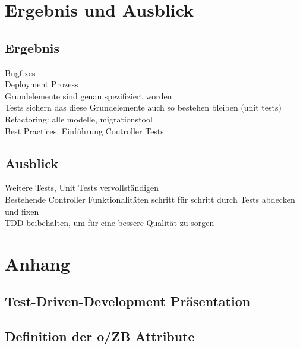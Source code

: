 \documentclass[12pt,             %
               a4paper,          %
               listof=totoc,     %
               index=totoc,      %
               bibliography=totoc,%
               oneside,         %
               BCOR1cm,          %
               english   %
               ]{scrbook}
\begin{document}
\chapter{Ergebnis und Ausblick}
\section{Ergebnis}
Bugfixes\\
Deployment Prozess\\
Grundelemente sind genau spezifiziert worden\\
Tests sichern das diese Grundelemente auch so bestehen bleiben (unit tests)\\
Refactoring: alle modelle, migrationstool\\
Best Practices, Einführung Controller Tests

\section{Ausblick}
Weitere Tests, Unit Tests vervollständigen\\
Bestehende Controller Funktionalitäten schritt für schritt durch Tests abdecken und fixen\\
TDD beibehalten, um für eine bessere Qualität zu sorgen

\clearpage
\appendix
\chapter{Anhang}\label{sec:appendix}
\section{Test-Driven-Development Präsentation}

\clearpage
\section{Definition der o/ZB Attribute}
\label{chapter:ozb_attribute}


\newpage
\listoffigures

\newpage
\listoftables

\newpage
\lstlistoflistings

\newpage

\end{document}
